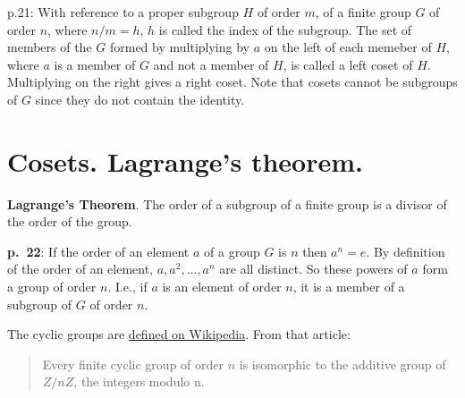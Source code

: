 \documentclass{book}
\begin{document}
p.21: With reference to a proper subgroup $H$ of order $m$, of a
finite group $G$ of order $n$, where $n/m = h$, $h$ is called the
index of the subgroup. The set of members of the $G$ formed by
multiplying by $a$ on the left of each memeber of $H$, where $a$ is a
member of $G$ and not a member of $H$, is called a left coset of
$H$. Multiplying on the right gives a right coset. Note that cosets
cannot be subgroups of $G$ since they do not contain the identity.

\section{Cosets. Lagrange's theorem.}

{\bf Lagrange's Theorem}. The order of a subgroup of a finite group is
a divisor of the order of the group.

{\bf p.\ 22}: If the order of an element $a$ of a group $G$ is $n$
then $a^n = e$. By definition of the order of an element,
$a,a^2,...,a^n$ are all distinct. So these powers of $a$ form a group
of order $n$. I.e., if $a$ is an element of order $n$, it is a member
of a subgroup of $G$ of order $n$.

The cyclic groups are
\href{https://en.wikipedia.org/wiki/Cyclic_group}{defined on
  Wikipedia}. From that article:

\begin{quote}
Every finite cyclic group of order $n$ is isomorphic to the additive
group of $Z/nZ$, the integers modulo n.
\end{quote}

\end{document}
